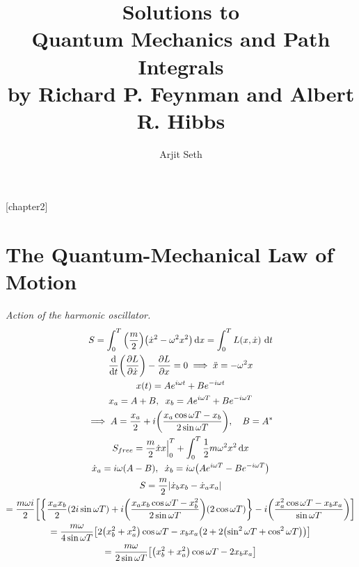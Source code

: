 \documentclass{report}
\begin{document}
\title{Solutions to \\ Quantum Mechanics and Path Integrals \\ by Richard P. Feynman and Albert R. Hibbs }

\author{Arjit Seth}
\date{}

\maketitle

\newtheorem{chapter2}{Problem}
[chapter2]

\chapter{The Quantum-Mechanical Law of Motion}

\begin{subquests}
	\item \emph{Action of the harmonic oscillator.}
	\begin{gather*}
		S = \int_0^T \pqty{\frac{m}{2}}\pqty{\dot{x}^2 - \omega^2 x^2} \dd{x} = \int_0^T L(x, \dot{x})\,\dd{t} \\
		\dv{t}\pqty{\pdv{L}{\dot x}} - \pdv{L}{x} = 0 \implies \ddot{x} = -\omega^2 x \\
		x(t) = Ae^{i\omega t} + Be^{-i\omega t} \\
		x_a = A + B,\;\; x_b = Ae^{i\omega T} + Be^{-i\omega T} \\
		\implies A = \frac{x_a}{2} + i\pqty{\frac{x_a \cos\omega T - x_b}{2\sin\omega T}}, 	\quad B = A^* \\
		S_{free} = \frac{m}{2}\dot{x}x\Big|_0^T + \int_0^T \frac{1}{2}m\omega^2x^2 \dd{x} \\
		\dot{x}_a = i\omega\pqty{A - B}, \;\; \dot{x}_b = i\omega\pqty{Ae^{i\omega T} - Be^{-i\omega T}}\\
		S = \frac{m}{2}\abs{\dot{x}_b x_b - \dot{x}_a x_a} \\
		= \frac{m\omega i}{2}\bqty{\qty{\frac{x_a x_b}{2}\pqty{2i\sin \omega T} + i\pqty{\frac{x_a x_b \cos\omega T - x_b^2}{2\sin\omega T}}\pqty{2\cos\omega T}} - i\pqty{\frac{x_a^2 \cos\omega T - x_b x_a}{\sin\omega T}}} \\
		= \frac{m\omega}{4\sin\omega T}\bqty{2\pqty{x_b^2 + x_a^2} \cos\omega T - x_b x_a \pqty{2 + 2\pqty{\sin^2 \omega T + \cos^2 \omega T}}} \\
		= \frac{m\omega}{2\sin\omega T}\bqty{\pqty{x_b^2 + x_a^2}\cos\omega T - 2x_b x_a}
	\end{gather*}
\end{subquests}
\end{document}
